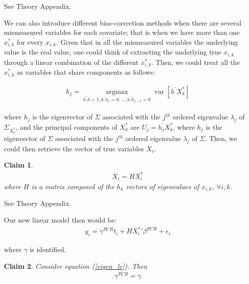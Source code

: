 \documentclass[10pt]{article}
\makeatletter
\newtheorem{claim}{Claim}
\renewenvironment{proof}[1][\proofname] {\par\pushQED{\qed}\normalfont\topsep6\p@\@plus6\p@\relax\trivlist\item[\hskip\labelsep\bfseries#1\@addpunct{.}]\ignorespaces}{\popQED\endtrivlist\@endpefalse}
\makeatother
\begin{document}
        \begin{proof}
        See Theory Appendix.
        \end{proof}
        
        We can also introduce different bias-correction methods when there are several mismeasured variables for each covariate; that is when we have more than one $x_{i,k}^*$ for every $x_{i,k}$. Given that in all the mismeasured variables the underlying value is the real value, one could think of extracting the underlying true $x_{i,k}$ through a linear combination of the different $x_{i,k}^*$. Then, we could treat all the $x_{i,k}^*$ as variables that share components as follows:

        \begin{align} \label{variance_max}
           h_{j}=\underset{h^{\prime} h=1, h^{\prime} h_{1}=0, \ldots, h^{\prime} h_{j-1}=0}{\operatorname{argmax}} \operatorname{var}\left[h^{\prime} X^*_k\right]  
        \end{align}
        
        where $h_j$ is the eigenvector of $\Sigma$ associated with the $j^{t h}$ ordered eigenvalue $\lambda_{j}$ of $\Sigma_{X^*_k}$, and the principal components of $X^*_k$ are $U_{j}=h_{j}^{\prime} X^*_k$, where $h_{j}$ is the eigenvector of $\Sigma$ associated with the $j^{t h}$ ordered eigenvalue $\lambda_{j}$ of $\Sigma$. Then, we could then retrieve the vector of true variables $X_i$.

        \begin{claim} \label{linear_combo}
            \begin{align}
                X_i=HX^*_i
            \end{align}
        where $H$ is a matrix composed of the $h_k$ vectors of eigenvalues of $x_{i,k}$, $\forall i,k$.
        \end{claim}

        \begin{proof}
            See Theory Appendix.
        \end{proof}
 
        Our new linear model then would be:
        \begin{align} \label{eigen_lc}
            y_i = \gamma^{PCR} t_i + H{X^*_i}'\beta^{PCR} + \epsilon_i
        \end{align}
        
        where $\gamma$ is identified.

        \begin{claim}
        Consider equation (\ref{eigen_lc}). Then
            \begin{align}
                {\gamma}^{PCR} = \gamma
            \end{align}
        \end{claim}
\end{document}
